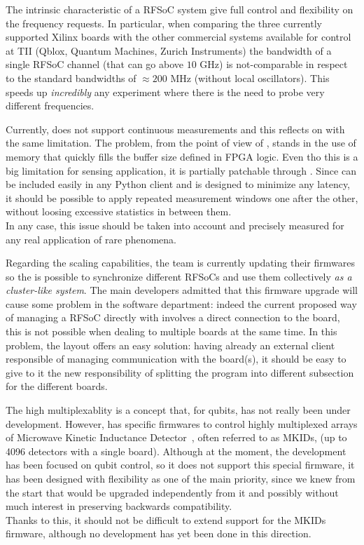 The intrinsic characteristic of a RFSoC system give full control and flexibility on the frequency requests. 
In particular, when comparing the three currently supported Xilinx boards with the other commercial systems available for control at TII (Qblox, Quantum Machines, Zurich Instruments) the bandwidth of a single RFSoC channel (that can go above $10$ GHz) is not-comparable in respect to the standard bandwidths of $\approx200$ MHz (without local oscillators).
This speeds up \textit{incredibly} any experiment where there is the need to probe very different frequencies.

Currently, \Qick does not support continuous measurements and this reflects on \Qibosoq with the same limitation.
The problem, from the point of view of \Qick, stands in the use of memory that quickly fills the buffer size defined in FPGA logic.
Even tho this is a big limitation for sensing application, it is partially patchable through \Qibosoq.
Since \Qibosoq can be included easily in any Python client and is designed to minimize any latency, it should be possible to apply repeated measurement windows one after the other, without loosing excessive statistics in between them.\\
In any case, this issue should be taken into account and precisely measured for any real application of rare phenomena.

Regarding the scaling capabilities, the \Qick team is currently updating their firmwares so the is possible to synchronize different RFSoCs and use them collectively \textit{as a cluster-like system}.
The main \Qick developers admitted that this firmware upgrade will cause some problem in the \Qick software department: indeed the current proposed way of managing a RFSoC directly with \Qick involves a direct connection to the board, this is not possible when dealing to multiple boards at the same time.
In this problem, the \Qibosoq layout offers an easy solution: having already an external client responsible of managing communication with the board(s), it should be easy to give to it the new responsibility of splitting the program into different subsection for the different boards.

The high multiplexablity is a concept that, for qubits, has not really been under development.
However, \Qick has specific firmwares to control highly multiplexed arrays of Microwave Kinetic Inductance Detector~\cite{Magniez2022}, often referred to as MKIDs, (up to 4096 detectors with a single board). 
Although at the moment, the \Qibosoq development has been focused on qubit control, so it does not support this special firmware, it has been designed with flexibility as one of the main priority, since we knew from the start that \Qick would be upgraded independently from it and possibly without much interest in preserving backwards compatibility.\\
Thanks to this, it should not be difficult to extend support for the MKIDs firmware, although no development has yet been done in this direction.

